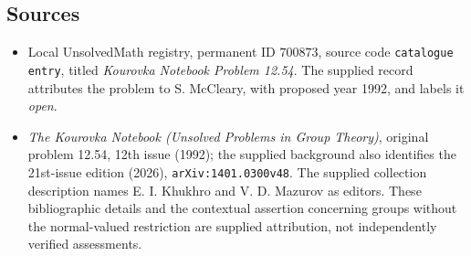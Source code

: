\documentclass[11pt]{article}
\begin{document}
\subsection{Sources}
\begin{itemize}
\item Local UnsolvedMath registry, permanent ID \(700873\), source code \texttt{catalogue entry}, titled \emph{Kourovka Notebook Problem 12.54}. The supplied record attributes the problem to S. McCleary, with proposed year 1992, and labels it \emph{open}.
\item \emph{The Kourovka Notebook (Unsolved Problems in Group Theory)}, original problem 12.54, 12th issue (1992); the supplied background also identifies the 21st-issue edition (2026), \texttt{arXiv:1401.0300v48}. The supplied collection description names E. I. Khukhro and V. D. Mazurov as editors. These bibliographic details and the contextual assertion concerning groups without the normal-valued restriction are supplied attribution, not independently verified assessments.
\end{itemize}
\end{document}
